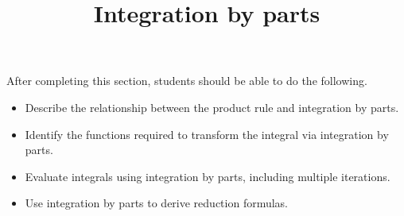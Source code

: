 \documentclass{ximera}
\title{Integration by parts}
\begin{document}
\begin{abstract}
\end{abstract}

\maketitle

\begin{sectionOutcomes}

After completing this section, students should be able to do the following.

\begin{itemize}
\item Describe the relationship between the product rule and integration by parts.
\item Identify the functions required to transform the integral via integration by parts.
\item Evaluate integrals using integration by parts, including multiple iterations.
\item Use integration by parts to derive reduction formulas.
\end{itemize}

\end{sectionOutcomes}
\end{document}
